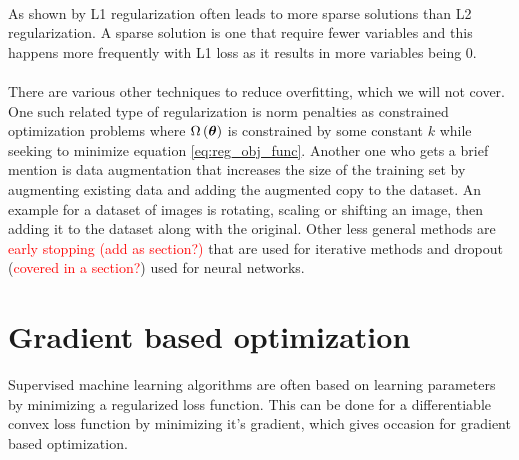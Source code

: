 \\
As shown by \cite{Goodfellow-et-al-2016} L1 regularization often leads to more sparse solutions than L2 regularization. A sparse solution is one that require fewer variables and this happens more frequently with L1 loss as it results in more variables being 0.\\
\\
There are various other techniques to reduce overfitting, which we will not cover. One such related type of regularization is norm penalties as constrained optimization problems where $\Omega \left (\boldsymbol{\theta}\right)$ is constrained by some constant $k$ while seeking to minimize equation \ref{eq:reg_obj_func}. Another one who gets a brief mention is data augmentation that increases the size of the training set by augmenting existing data and adding the augmented copy to the dataset. An example for a dataset of images is rotating, scaling or shifting an image, then adding it to the dataset along with the original. Other less general methods are \textcolor{red}{early stopping (add as section?)} that are used for iterative methods and dropout (\textcolor{red}{covered in a section?}) used for neural networks. 


\section{Gradient based optimization} 
Supervised machine learning algorithms are often based on learning parameters by minimizing a regularized loss function. This can be done for a differentiable convex loss function by minimizing it's gradient, which gives occasion for gradient based optimization. 

